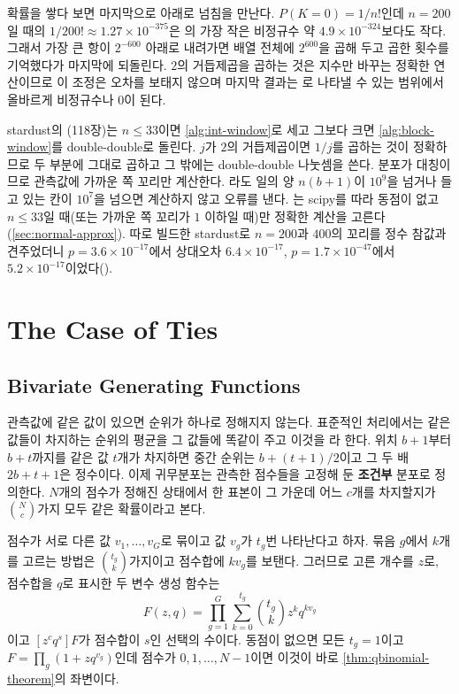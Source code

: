 확률을 쌓다 보면 마지막으로 아래로 넘침을 만난다. $P(K=0)=1/n!$인데 $n=200$일 때의 $1/200!\approx1.27\times10^{-375}$은 의 가장 작은 비정규수 약 $4.9\times10^{-324}$보다도 작다. 그래서 가장 큰 항이 $2^{-600}$ 아래로 내려가면 배열 전체에 $2^{600}$을 곱해 두고 곱한 횟수를 기억했다가 마지막에 되돌린다. $2$의 거듭제곱을 곱하는 것은 지수만 바꾸는 정확한 연산이므로 이 조정은 오차를 보태지 않으며 마지막 결과는 로 나타낼 수 있는 범위에서 올바르게 비정규수나 $0$이 된다.

stardust의 (118장)는 $n\le33$이면 \cref{alg:int-window}로 세고 그보다 크면 \cref{alg:block-window}를 double-double로 돌린다. $j$가 $2$의 거듭제곱이면 $1/j$를 곱하는 것이 정확하므로 두 부분에 그대로 곱하고 그 밖에는 double-double 나눗셈을 쓴다. 분포가 대칭이므로 관측값에 가까운 쪽 꼬리만 계산한다. 라도 일의 양 $n(b+1)$이 $10^9$을 넘거나 들고 있는 칸이 $10^7$을 넘으면 계산하지 않고 오류를 낸다. 는 scipy를 따라 동점이 없고 $n\le33$일 때(또는 가까운 쪽 꼬리가 $1$ 이하일 때)만 정확한 계산을 고른다(\cref{sec:normal-approx}). 따로 빌드한 stardust로 $n=200$과 $400$의 꼬리를 정수 참값과 견주었더니 $p=3.6\times10^{-17}$에서 상대오차 $6.4\times10^{-17}$, $p=1.7\times10^{-47}$에서 $5.2\times10^{-17}$이었다().


\section{The Case of Ties}
\label{sec:perm-ties}

\subsection{Bivariate Generating Functions}

관측값에 같은 값이 있으면 순위가 하나로 정해지지 않는다. 표준적인 처리에서는 같은 값들이 차지하는 순위의 평균을 그 값들에 똑같이 주고 이것을 라 한다. 위치 $b+1$부터 $b+t$까지를 같은 값 $t$개가 차지하면 중간 순위는 $b+(t+1)/2$이고 그 두 배 $2b+t+1$은 정수이다. 이제 귀무분포는 관측한 점수들을 고정해 둔 \textbf{조건부} 분포로 정의한다. $N$개의 점수가 정해진 상태에서 한 표본이 그 가운데 어느 $c$개를 차지할지가 $\binom Nc$가지 모두 같은 확률이라고 본다.

점수가 서로 다른 값 $v_1,\dots,v_G$로 묶이고 값 $v_g$가 $t_g$번 나타난다고 하자. 묶음 $g$에서 $k$개를 고르는 방법은 $\binom{t_g}k$가지이고 점수합에 $kv_g$를 보탠다. 그러므로 고른 개수를 $z$로, 점수합을 $q$로 표시한 두 변수 생성 함수는
\[
F(z,q)=\prod_{g=1}^G\sum_{k=0}^{t_g}\binom{t_g}kz^kq^{kv_g}
\]
이고 $[z^cq^s]F$가 점수합이 $s$인 선택의 수이다. 동점이 없으면 모든 $t_g=1$이고 $F=\prod_g(1+zq^{v_g})$인데 점수가 $0,1,\dots,N-1$이면 이것이 바로 \cref{thm:qbinomial-theorem}의 좌변이다.


